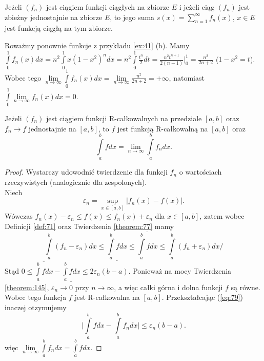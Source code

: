 \documentclass[leqno]{article}
\begin{document}
\begin{justify}
\begin{wniosek}
{
    Jeżeli $(f_n)$ jest ciągiem funkcji ciągłych na zbiorze $E$ i jeżeli ciąg $(f_n)$ jest 
    zbieżny jednostajnie na zbiorze $E$, to jego suma $s(x) = \sum\limits_{n=1}^{\infty}f_n(x)$, $x \in E$ jest funkcją
    ciągłą na tym zbiorze. 
}
\end{wniosek}

\begin{ex}
    Roważmy ponownie funkcje z przykładu \ref{ex:41} (b). Mamy $\int\limits_{0}^{1}f_n(x)dx =
    n^2 \int\limits_{0}^{1}x{(1-x^2)}^n dx = n^2 \int\limits_{0}^{1}\frac{t^n}{2}dt = \frac{n^2 t^{n+1}}{2(n+1)} \Big|_0^1 =
    \frac{n^2}{2n+2}$ ($1 - x^2 = t$). Wobec tego $\lim\limits_{n \to \infty} \int\limits_{0}^{1}f_n(x)dx = 
    \lim\limits_{n \to \infty}\frac{n^2}{2n+2} = + \infty$, natomiast $\int\limits_{0}^{1}\lim\limits_{n \to \infty}f_n(x)dx = 0$.
\end{ex}

\begin{theorem}
{
    Jeżeli $(f_n)$ jest ciągiem funkcji R-całkowalnych na przedziale $[a,b]$ oraz $f_n \to f$ jednostajnie na $[a,b]$, to $f$ jest funkcją
    R-całkowalną na $[a,b]$ oraz
    \[
        \int\limits_{a}^{b}fdx = \lim_{n \to \infty}\int\limits_{a}^{b}f_n dx.
    \]
}
\end{theorem}

\begin{proof}
    Wystarczy udowodnić twierdzenie dla funkcji $f_n$ o wartościach rzeczywistych (analogicznie dla zespolonych). \\
    Niech 
    \[
        \varepsilon_n = \sup\limits_{x \in [a,b]}|f_n(x) - f(x)|.
    \]
    Wówczas $f_n(x) - \varepsilon_n \leqslant f(x) \leqslant f_n(x) + \varepsilon_n$ dla $x \in [a,b]$, zatem wobec
    Definicji \ref{def:71} oraz Twierdzenia \ref{theorem:77} mamy
    \begin{equation}\label{eq:79}
        \int\limits_{a}^{b}(f_n - \varepsilon_n)dx \leqslant \underline{\int\limits_{a}^{b}fdx} \leqslant \overline{\int\limits_{a}^{b}fdx} \leqslant \int\limits_{a}^{b}(f_n + \varepsilon_n)dx/
    \end{equation}
    Stąd $0 \leqslant \overline{\int\limits_{a}^{b}fdx} - \underline{\int\limits_{a}^{b}fdx} \leqslant 2\varepsilon_n(b-a)$.
    Ponieważ na mocy Twierdzenia \ref{theorem:145}, $\varepsilon_n \to 0$ przy $n \to \infty$, a więc całki górna i dolna funkcji $f$ są równe.
    Wobec tego funkcja $f$ jest R-całkowalna na $[a,b]$. Przekształcając (\ref{eq:79}) inaczej otzymujemy
    \[
        \Bigg|\int\limits_{a}^{b}fdx -  \int\limits_{a}^{b}f_n dx \Bigg| \leqslant \varepsilon_n(b-a).
    \]
    więc $\lim\limits_{n \to \infty}\int\limits_{a}^{b}f_n dx = \int\limits_{a}^{b}fdx$.
\end{proof}


\end{justify}
\end{document}
